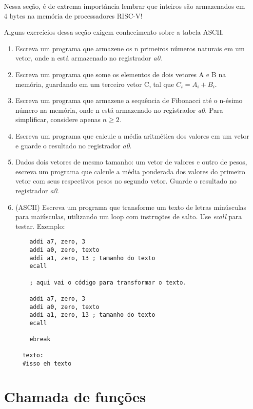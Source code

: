 \documentclass{article}
\begin{document}
Nessa seção, é de extrema importância lembrar que inteiros são armazenados em 4
bytes na memória de processadores RISC-V!

Alguns exercícios dessa seção exigem conhecimento sobre a tabela ASCII.

\begin{enumerate}
  \item Escreva um programa que armazene os n primeiros números naturais em um
  vetor, onde n está armazenado no registrador \textit{a0}.

  \item Escreva um programa que some os elementos de dois vetores A e B na
  memória, guardando em um terceiro vetor C, tal que $C_i = A_i + B_i$.

  \item Escreva um programa que armazene a sequência de Fibonacci até o n-ésimo
  número na memória, onde n está armazenado no registrador \textit{a0}. Para
  simplificar, considere apenas $n \geq 2$.

  \item Escreva um programa que calcule a média aritmética dos valores em um
  vetor e guarde o resultado no registrador \textit{a0}.

  \item Dados dois vetores de mesmo tamanho: um vetor de valores e outro de
  pesos, escreva um programa que calcule a média ponderada dos valores do
  primeiro vetor com seus respectivos pesos no segundo vetor. Guarde o resultado
  no registrador \textit{a0}.

  \item (ASCII) Escreva um programa que transforme um texto de letras minúsculas
  para maiúsculas, utilizando um loop com instruções de salto. Use
  \textit{ecall} para testar. Exemplo:

  \begin{verbatim}
    addi a7, zero, 3
    addi a0, zero, texto
    addi a1, zero, 13 ; tamanho do texto
    ecall

    ; aqui vai o código para transformar o texto.

    addi a7, zero, 3
    addi a0, zero, texto
    addi a1, zero, 13 ; tamanho do texto
    ecall

    ebreak

  texto:
  #isso eh texto
  \end{verbatim}

\end{enumerate}

\section{Chamada de funções}
\end{document}
